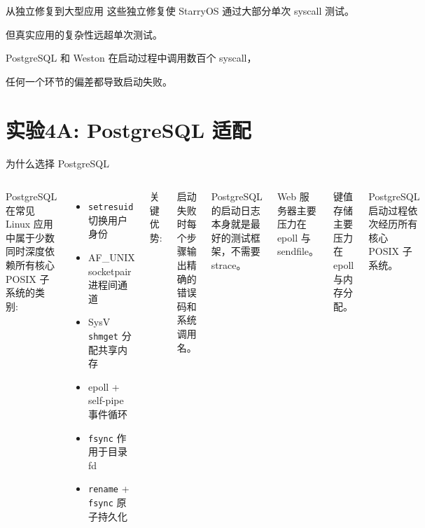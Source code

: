 \documentclass[aspectratio=169,10pt]{ctexbeamer}
\newcommand{\highlight}[1]{\textcolor{accent}{#1}}
\begin{document}

\begin{frame}{从独立修复到大型应用}
这些独立修复使 StarryOS 通过大部分单次 syscall 测试。

\vspace{1mm}
\centering
但真实应用的复杂性远超单次测试。

PostgreSQL 和 Weston 在启动过程中调用数百个 syscall，

任何一个环节的偏差都导致启动失败。

\vspace{1mm}
\end{frame}


\section{实验4A: PostgreSQL 适配}

\begin{frame}{为什么选择 PostgreSQL}
\begin{columns}[T]
PostgreSQL 在常见 Linux 应用中属于少数同时深度依赖所有核心 POSIX 子系统的类别:

\begin{itemize}
  \item \texttt{setresuid} 切换用户身份
  \item AF\_UNIX socketpair 进程间通道
  \item SysV \texttt{shmget} 分配共享内存
  \item epoll + self-pipe 事件循环
  \item \texttt{fsync} 作用于目录 fd
  \item \texttt{rename} + \texttt{fsync} 原子持久化
\end{itemize}

\highlight{关键优势:}

启动失败时每个步骤输出精确的错误码和系统调用名。

PostgreSQL 的启动日志本身就是最好的测试框架，不需要 strace。

\bigskip
Web 服务器主要压力在 epoll 与 sendfile。

键值存储主要压力在 epoll 与内存分配。

PostgreSQL 启动过程依次经历所有核心 POSIX 子系统。
\end{columns}
\end{frame}
\end{document}
